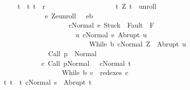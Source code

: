 \begin{isabellebody}
\ \ \ \ \ \ \ \ \ \ \ \ \ t\ {\isasymin}\ {\isacharbraceleft}t{\isachardot}\ {\isacharparenleft}t{\isacharcomma}{\isasymtau}{\isacharparenright}\ {\isasymin}\ {\isacharquery}r{\isacharbraceright}\ {\isasyminter}\ \ \isanewline
\ \ \ \ \ \ \ \ \ \ \ \ \ \ \ \ \ {\isacharbraceleft}t{\isachardot}\ {\isacharparenleft}Z{\isacharcomma}\ t{\isacharparenright}\ {\isasymin}\ {\isacharquery}unroll\ {\isasymand}\ \isanewline
\ \ \ \ \ \ \ \ \ \ \ \ \ \ \ \ \ \ \ \ \ {\isacharparenleft}{\isasymforall}e{\isachardot}\ {\isacharparenleft}Z{\isacharcomma}e{\isacharparenright}{\isasymin}{\isacharquery}unroll\ {\isasymlongrightarrow}\ \ e{\isasymin}b\ \isanewline
\ \ \ \ \ \ \ \ \ \ \ \ \ \ \ \ \ \ \ \ \ \ \ \ \ \ \ {\isasymlongrightarrow}\ {\isasymGamma}{\isasymturnstile}{\isasymlangle}c{\isacharcomma}Normal\ e{\isasymrangle}\ {\isasymRightarrow}{\isasymnotin}{\isacharparenleft}{\isacharbraceleft}Stuck{\isacharbraceright}\ {\isasymunion}\ Fault\ {\isacharbackquote}\ {\isacharparenleft}{\isacharminus}F{\isacharparenright}{\isacharparenright}\ {\isasymand}\ \isanewline
\ \ \ \ \ \ \ \ \ \ \ \ \ \ \ \ \ \ \ \ \ \ \ \ \ \ \ \ \ \ {\isacharparenleft}{\isasymforall}u{\isachardot}\ {\isasymGamma}{\isasymturnstile}{\isasymlangle}c{\isacharcomma}Normal\ e{\isasymrangle}\ {\isasymRightarrow}Abrupt\ u\ {\isasymlongrightarrow}\ \isanewline
\ \ \ \ \ \ \ \ \ \ \ \ \ \ \ \ \ \ \ \ \ \ \ \ \ \ \ \ \ \ \ \ \ \ {\isasymGamma}{\isasymturnstile}{\isasymlangle}While\ b\ c{\isacharcomma}Normal\ Z{\isasymrangle}\ {\isasymRightarrow}\ Abrupt\ u{\isacharparenright}{\isacharparenright}\ {\isasymand}\ \isanewline
\ \ \ \ \ \ \ \ \ \ \ \ \ \ \ \ \ \ \ \ \ \ {\isasymGamma}{\isasymturnstile}Call\ p\ {\isasymdown}\ Normal\ {\isasymsigma}\ {\isasymand}\isanewline
\ \ \ \ \ \ \ \ \ \ \ \ \ \ \ \ \ \ \ \ {\isacharparenleft}{\isasymexists}c{\isacharprime}{\isachardot}\ {\isasymGamma}{\isasymturnstile}{\isacharparenleft}Call\ p{\isacharcomma}Normal\ {\isasymsigma}{\isacharparenright}\ {\isasymrightarrow}\isactrlsup {\isacharplus}\ {\isacharparenleft}c{\isacharprime}{\isacharcomma}Normal\ t{\isacharparenright}\ {\isasymand}\ \isanewline
\ \ \ \ \ \ \ \ \ \ \ \ \ \ \ \ \ \ \ \ \ \ \ \ \ \ While\ b\ c\ {\isasymin}\ redexes\ c{\isacharprime}{\isacharparenright}{\isacharbraceright}{\isacharparenright}\ {\isasymand}\ \isanewline
\ \ \ \ \ \ \ \ \ {\isacharparenleft}{\isasymforall}t{\isachardot}\ t\ {\isasymin}\ {\isacharbraceleft}t{\isachardot}\ {\isasymGamma}{\isasymturnstile}{\isasymlangle}c{\isacharcomma}Normal\ s{\isasymrangle}\ {\isasymRightarrow}\ Abrupt\ t{\isacharbraceright}\ {\isasymlongrightarrow}\isanewline

\end{isabellebody}
